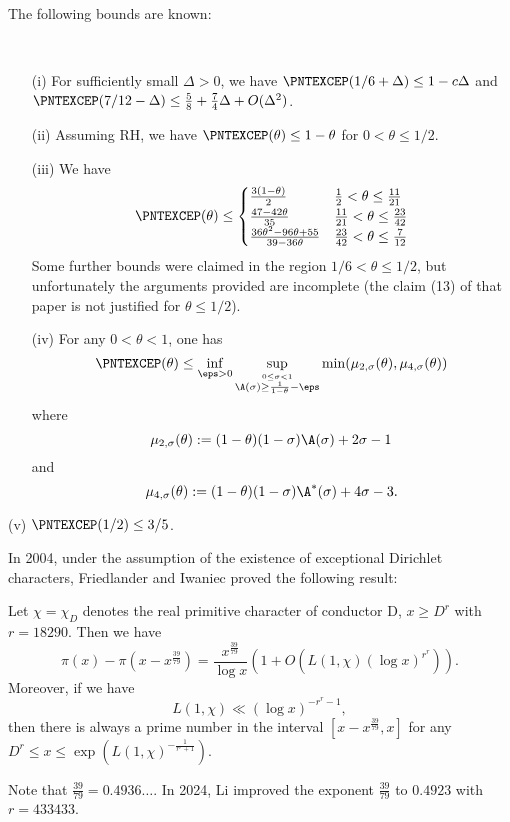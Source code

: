 The following bounds are known:

\begin{lemma}[Bounds on $\mu$]\label{baz-bound}\
  \begin{itemize}
  \item[(i)]  \cite[Theorem 2(i)]{bazzanella-perelli}  For sufficiently small $\Delta>0$, we have $\PNTEXCEP(1/6 + \Delta) \leq 1 - c\Delta$ and $\PNTEXCEP(7/12-\Delta) \leq \frac{5}{8} + \frac{7}{4}\Delta + O(\Delta^2)$.
  \item[(ii)] \cite[Theorem 2(ii)]{bazzanella-perelli} Assuming RH, we have $\PNTEXCEP(\theta) \leq 1-\theta$ for $0 < \theta \leq 1/2$.
    \item[(iii)] \cite[Lemma 1]{bazzanella} We have
  $$
  \PNTEXCEP(\theta) \leq
  \begin{cases}
  \frac{3(1-\theta)}{2} & \frac{1}{2} < \theta \leq \frac{11}{21} \\
  \frac{47-42\theta}{35}& \frac{11}{21} < \theta \leq \frac{23}{42} \\
  \frac{36\theta^2-96\theta+55}{39-36\theta} & \frac{23}{42} < \theta \leq \frac{7}{12} \\
  \end{cases}
  $$
  Some further bounds were claimed in the region $1/6 < \theta \leq 1/2$, but unfortunately the arguments provided are incomplete (the claim (13) of that paper is not justified for $\theta \leq 1/2$).
  \item[(iv)] \cite{gafni-tao} For any $0 < \theta < 1$, one has
$$\PNTEXCEP(\theta) \leq \inf_{\eps>0} \sup_{\stackrel{0 \leq \sigma < 1}{\A(\sigma) \geq \frac{1}{1-\theta}-\eps}} \min(\mu_{2,\sigma}(\theta), \mu_{4,\sigma}(\theta))$$
where
$$ \mu_{2,\sigma}(\theta) := (1-\theta)(1-\sigma) \A(\sigma) + 2\sigma - 1$$
and
$$ \mu_{4,\sigma}(\theta) := (1-\theta)(1-\sigma) \A^*(\sigma) + 4\sigma-3.$$
  \end{itemize}
  \item[(v)] \cite[Theorem 2]{heath-brown_differences_2021} $\PNTEXCEP(1/2) \leq 3/5$.
\end{lemma}


In 2004, under the assumption of the existence of exceptional Dirichlet characters, Friedlander and Iwaniec \cite{FI2004} proved the following result:
\begin{theorem}\cite{FI2004}
Let $\chi=\chi_{D}$ denotes the real primitive character of conductor D, $x \geqslant D^{r}$ with $r=18290$. Then we have
$$
\pi(x) - \pi\left(x-x^{\frac{39}{79}}\right) = \frac{x^{\frac{39}{79}}}{\log x} \left(1 + O\left(L(1, \chi)(\log x)^{r^{r}}\right)\right).
$$
Moreover, if we have
$$
L(1, \chi) \ll (\log x)^{-r^{r}-1},
$$
then there is always a prime number in the interval $\left[x - x^{\frac{39}{79}}, x \right]$ for any $D^{r} \leqslant x \leqslant \exp\left(L(1, \chi)^{- \frac{1}{r^r + 1} } \right)$.
\end{theorem}
Note that $\frac{39}{79} = 0.4936 \dots$. In 2024, Li \cite{li_hybrid_2024} improved the exponent $\frac{39}{79}$ to $0.4923$ with $r=433433$.

